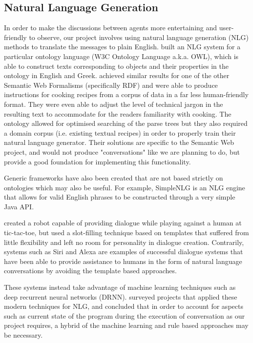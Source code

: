 \documentclass[conference]{IEEEtran}
\begin{document}
\subsection{Natural Language Generation}

In order to make the discussions between agents more entertaining and user-friendly to observe, our project involves using natural language generation (NLG) methods to translate the messages to plain English. \cite{owlnlg} built an NLG system for a particular ontology language (W3C Ontology Language a.k.a. OWL), which is able to construct texts corresponding to objects and their properties in the ontology in English and Greek. \cite{rdfnlg} achieved similar results for one of the other Semantic Web Formalisms (specifically RDF) and were able to produce instructions for cooking recipes from a corpus of data in a far less human-friendly format. They were even able to adjust the level of technical jargon in the resulting text to accommodate for the readers familiarity with cooking. The ontology allowed for optimised searching of the parse trees but they also required a domain corpus (i.e. existing textual recipes) in order to properly train their natural language generator. Their solutions are specific to the Semantic Web project, and would not produce "conversations" like we are planning to do, but provide a good foundation for implementing this functionality.

Generic frameworks have also been created that are not based strictly on ontologies which may also be useful. For example, SimpleNLG \cite{simplenlg} is an NLG engine that allows for valid English phrases to be constructed through a very simple Java API. 

\cite{robotgame} created a robot capable of providing dialogue while playing against a human at tic-tac-toe, but used a slot-filling technique based on templates that suffered from little flexibility and left no room for personality in dialogue creation. Contrarily, systems such as Siri and Alexa are examples of successful dialogue systems that have been able to provide assistance to humans in the form of natural language conversations by avoiding the template based approaches.

These systems instead take advantage of machine learning techniques such as deep recurrent neural networks (DRNN). \cite{dialoguesystems} surveyed projects that applied these modern techniques for NLG, and concluded that in order to account for aspects such as current state of the program during the execution of conversation as our project requires, a hybrid of the machine learning and rule based approaches may be necessary. 
\end{document}
